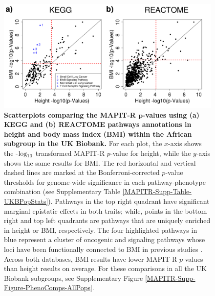 \documentclass[10pt]{article}
\def\log{{\rm log}}
\begin{document}
\begin{figure}[htb]
\centering
\includegraphics[width=\textwidth]{Images/Main/Figure3.png}
\caption{\textbf{Scatterplots comparing the MAPIT-R $\bm{p}$-values using (a) KEGG and (b) REACTOME pathways annotations in height and body mass index (BMI) within the African subgroup in the UK Biobank.} For each plot, the $x$-axis shows the -$\log_{10}$ transformed MAPIT-R $p$-value for height, while the $y$-axis shows the same results for BMI. The red horizontal and vertical dashed lines are marked at the Bonferroni-corrected $p$-value thresholds for genome-wide significance in each pathway-phenotype combination (see Supplementary Table \ref{MAPITR-Supp-Table-UKBPopStats}). Pathways in the top right quadrant have significant marginal epistatic effects in both traits; while, points in the bottom right and top left quadrants are pathways that are uniquely enriched in height or BMI, respectively. The four highlighted pathways in blue represent a cluster of oncogenic and signaling pathways whose loci have been functionally connected to BMI in previous studies \cite{George2004,Ortega-Molina2015,Manning2017,Justice2017,Latva-Rasku2018,Grigsby2018,Huang2018,Couto2019}. Across both databases, BMI results have lower MAPIT-R $p$-values than height results on average. For these comparisons in all the UK Biobank subgroups, see Supplementary Figure \ref{MAPITR-Supp-Figure-PhenoComps-AllPops}.}
\label{MAPITR-Main-Figure-PhenoComps-African}
\end{figure}

\end{document}
